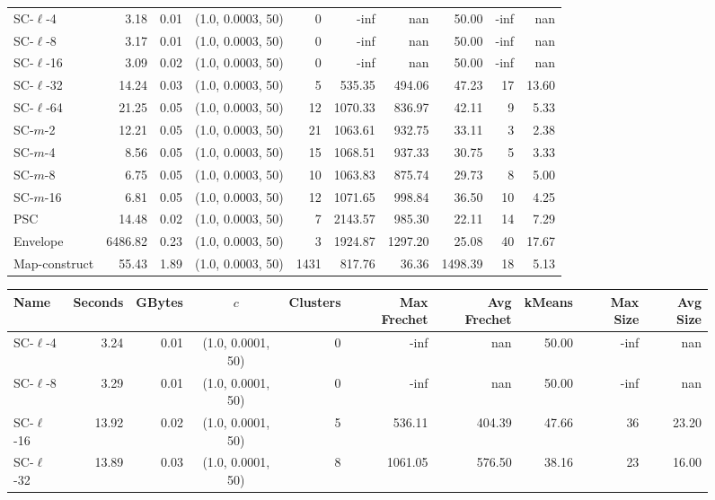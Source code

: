 \begin{figure}
\begin{center}
\begin{minipage}{\textwidth}
{\begin{tabular}{@{}lrrcrrrrrr@{}}
        \midrule
        SC-$\ell$-4 & 3.18 & 0.01 & (1.0, 0.0003, 50) & 0 & -inf & nan & 50.00 & -inf & nan\\
        SC-$\ell$-8 & 3.17 & 0.01 & (1.0, 0.0003, 50) & 0 & -inf & nan & 50.00 & -inf & nan\\
        SC-$\ell$-16 & 3.09 & 0.02 & (1.0, 0.0003, 50) & 0 & -inf & nan & 50.00 & -inf & nan\\
        SC-$\ell$-32 & 14.24 & 0.03 & (1.0, 0.0003, 50) & 5 & 535.35 & 494.06 & 47.23 & 17 & 13.60\\
        SC-$\ell$-64 & 21.25 & 0.05 & (1.0, 0.0003, 50) & 12 & 1070.33 & 836.97 & 42.11 & 9 & 5.33\\
        SC-$m$-2 & 12.21 & 0.05 & (1.0, 0.0003, 50) & 21 & 1063.61 & 932.75 & 33.11 & 3 & 2.38\\
        SC-$m$-4 & 8.56 & 0.05 & (1.0, 0.0003, 50) & 15 & 1068.51 & 937.33 & 30.75 & 5 & 3.33\\
        SC-$m$-8 & 6.75 & 0.05 & (1.0, 0.0003, 50) & 10 & 1063.83 & 875.74 & 29.73 & 8 & 5.00\\
        SC-$m$-16 & 6.81 & 0.05 & (1.0, 0.0003, 50) & 12 & 1071.65 & 998.84 & 36.50 & 10 & 4.25\\
        PSC & 14.48 & 0.02 & (1.0, 0.0003, 50) & 7 & 2143.57 & 985.30 & 22.11 & 14 & 7.29\\
        Envelope & 6486.82 & 0.23 & (1.0, 0.0003, 50) & 3 & 1924.87 & 1297.20 & 25.08 & 40 & 17.67\\
        Map-construct & 55.43 & 1.89 & (1.0, 0.0003, 50) & 1431 & 817.76 & 36.36 & 1498.39 & 18 & 5.13\\
        \bottomrule
    \end{tabular}
    }
    {
    \begin{tabular}{@{}lrrcrrrrrr@{}}
        \toprule
        Name & Seconds & GBytes & $c$ & Clusters & Max Frechet & Avg Frechet & kMeans & Max Size & Avg Size\\
        \midrule
        SC-$\ell$-4 & 3.24 & 0.01 & (1.0, 0.0001, 50) & 0 & -inf & nan & 50.00 & -inf & nan\\
        SC-$\ell$-8 & 3.29 & 0.01 & (1.0, 0.0001, 50) & 0 & -inf & nan & 50.00 & -inf & nan\\
        SC-$\ell$-16 & 13.92 & 0.02 & (1.0, 0.0001, 50) & 5 & 536.11 & 404.39 & 47.66 & 36 & 23.20\\
        SC-$\ell$-32 & 13.89 & 0.03 & (1.0, 0.0001, 50) & 8 & 1061.05 & 576.50 & 38.16 & 23 & 16.00\\

\end{tabular}}
\end{minipage}
\end{center}
\end{figure}
